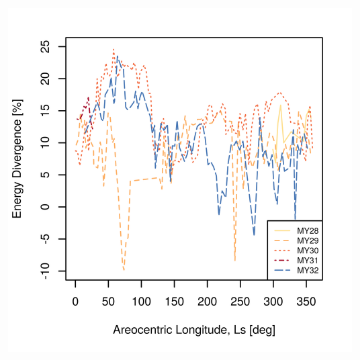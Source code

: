 \begin{figure}[h]
\captionsetup[subfigure]{justification=centering}
\vspace{-2ex}
\centering
    \setlength{\subfigureWidth}{0.50\textwidth}
    \setlength{\graphicsHeight}{80mm}
    \hypersetup{hidelinks=true}%
    \begin{subfigure}[t]{\subfigureWidth}
        \centering
            \includegraphics[height=\graphicsHeight]{sections/appendix/energy-error-margin/plots/energy-prediction-divergences-from-my28-to-my32-adjusted.png}
            \label{fig:plot:mer-energy-prediction-divergences-adjusted-including-outliers}
    \end{subfigure}\hfill
    \begin{subfigure}[t]{\subfigureWidth}
        \centering

\end{subfigure}
\end{figure}
